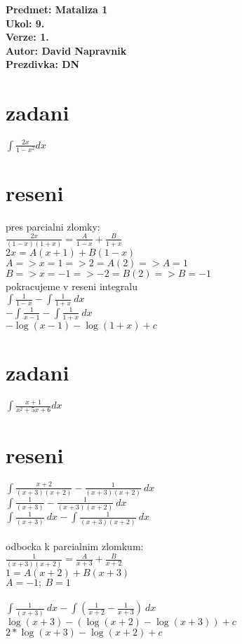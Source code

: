 \documentclass[a4paper]{article}
\def\doubleunderline#1{\underline{\underline{#1}}}
\begin{document}
\noindent
\textbf{Predmet: Mataliza 1}\\
\textbf{Ukol: 9.}\\
\textbf{Verze: 1.}\\
\textbf{Autor: David Napravnik}\\
\textbf{Prezdivka: DN}


\section*{zadani}
$\int \frac{2x}{1-x^2} dx$

\section*{reseni}
pres parcialni zlomky:\\
$\frac{2x}{(1-x)(1+x)}=\frac{A}{1-x}+\frac{B}{1+x}$\\
$2x=A(x+1)+B(1-x)$\\
$A=> x=1 => 2=A(2) => A=1$\\
$B=> x=-1 => -2=B(2) => B=-1$\\
pokracujeme v reseni integralu\\
$\int \frac{1}{1-x} - \int \frac{1}{1+x}~dx$\\
$-\int \frac{1}{x-1} - \int \frac{1}{1+x}~dx$\\
\doubleunderline{$-\log(x-1) - \log(1+x)+c$}\\









\section*{zadani}
$\int \frac{x+1}{x^2+5x+6} dx$

\section*{reseni}
$\int \frac{x+2}{(x+3)(x+2)} - \frac{1}{(x+3)(x+2)}~dx$\\
$\int \frac{1}{(x+3)} - \frac{1}{(x+3)(x+2)}~dx$\\
$\int \frac{1}{(x+3)}~dx - \int \frac{1}{(x+3)(x+2)}~dx$\\
\\
odbocka k parcialnim zlomkum:\\
$\frac{1}{(x+3)(x+2)}=\frac{A}{x+3}+\frac{B}{x+2}$\\
$1=A(x+2)+B(x+3)$\\
$A=-1;~B=1$\\
\\
$\int \frac{1}{(x+3)}~dx - \int\left( \frac{1}{x+2}-\frac{1}{x+3}\right)~dx$\\
$\log(x+3) - (\log(x+2)-\log(x+3)) + c$\\
\doubleunderline{$2*\log(x+3) - \log(x+2) + c$}\\
\end{document}
